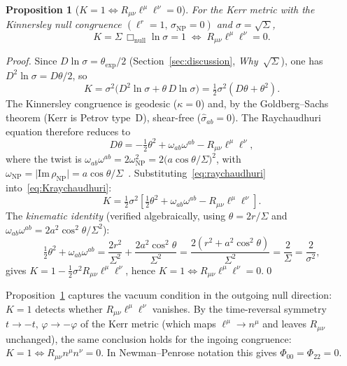 \documentclass[11pt,a4paper]{article}
\newtheorem{proposition}[theorem]{Proposition}
\begin{document}
\begin{proposition}[$K{=}1\Leftrightarrow R_{\mu\nu}\ell^\mu\ell^\nu=0$]
\label{prop:equiv}
For the Kerr metric with the Kinnersley null congruence
$(\ell^r=1,\,\sigma_{\scriptscriptstyle\mathrm{NP}}=0)$ and
$\sigma=\sqrt{\Sigma}$,
\[
  K=\Sigma\,\Box_{\mathrm{null}}\ln\sigma=1
  \;\Longleftrightarrow\;
  R_{\mu\nu}\ell^\mu\ell^\nu = 0.
\]
\end{proposition}

\begin{proof}
Since $D\ln\sigma=\theta_{\mathrm{exp}}/2$ (Section~\ref{sec:discussion},
\textit{Why~$\sqrt{\Sigma}$}), one has $D^2\ln\sigma=D\theta/2$, so
\begin{equation}\label{eq:Kraychaudhuri}
  K = \sigma^2\bigl(D^2\ln\sigma+\theta\,D\ln\sigma\bigr)
    = \tfrac{1}{2}\sigma^2(D\theta+\theta^2).
\end{equation}
The Kinnersley congruence is geodesic ($\kappa=0$) and, by
the Goldberg--Sachs theorem (Kerr is Petrov type~D), shear-free
($\hat\sigma_{ab}=0$).
The Raychaudhuri equation therefore reduces to
\begin{equation}\label{eq:raychaudhuri}
  D\theta = -\tfrac{1}{2}\theta^2
    + \omega_{ab}\omega^{ab}
    - R_{\mu\nu}\ell^\mu\ell^\nu,
\end{equation}
where the twist is
$\omega_{ab}\omega^{ab}=2\omega_{\scriptscriptstyle\mathrm{NP}}^2
=2\bigl(a\cos\theta/\Sigma\bigr)^2$,
with $\omega_{\scriptscriptstyle\mathrm{NP}}=\lvert\mathrm{Im}\,
\rho_{\scriptscriptstyle\mathrm{NP}}\rvert
=a\cos\theta/\Sigma$~\cite[Sec.~56]{Chandrasekhar1983}.
Substituting~\eqref{eq:raychaudhuri} into~\eqref{eq:Kraychaudhuri}:
\[
  K = \tfrac{1}{2}\sigma^2\!\left[
    \tfrac{1}{2}\theta^2+\omega_{ab}\omega^{ab}
    -R_{\mu\nu}\ell^\mu\ell^\nu\right].
\]
The \emph{kinematic identity} (verified algebraically,
using $\theta=2r/\Sigma$ and $\omega_{ab}\omega^{ab}=2a^2\cos^2\!\theta/\Sigma^2$):
\begin{equation}\label{eq:kinematic}
  \tfrac{1}{2}\theta^2+\omega_{ab}\omega^{ab}
  = \frac{2r^2}{\Sigma^2}+\frac{2a^2\cos^2\!\theta}{\Sigma^2}
  = \frac{2(r^2+a^2\cos^2\!\theta)}{\Sigma^2}
  = \frac{2}{\Sigma}=\frac{2}{\sigma^2},
\end{equation}
gives $K=1-\tfrac{1}{2}\sigma^2 R_{\mu\nu}\ell^\mu\ell^\nu$,
hence $K=1\Leftrightarrow R_{\mu\nu}\ell^\mu\ell^\nu=0$.\qed
\end{proof}

\noindent
Proposition~\ref{prop:equiv} captures the vacuum condition
in the outgoing null direction: $K{=}1$ detects whether
$R_{\mu\nu}\ell^\mu\ell^\nu$ vanishes.
By the time-reversal symmetry $t\to -t,\,\varphi\to -\varphi$
of the Kerr metric (which maps $\ell^\mu\to n^\mu$ and leaves
$R_{\mu\nu}$ unchanged), the same conclusion holds for the
ingoing congruence: $K{=}1\Leftrightarrow R_{\mu\nu}n^\mu n^\nu=0$.
In Newman--Penrose notation this gives
$\Phi_{00}=\Phi_{22}=0$.
\end{document}
